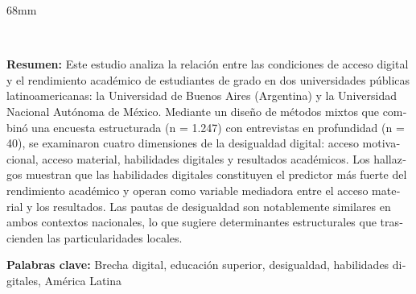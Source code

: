 \begin{textblock*}{68mm}
{\begin{minipage}[t]{68mm}
{\href{https://wa.me/?text=https%3A%2F%2Fwww.redalyc.org%2Fjournal%2F4136%2F413677448001%2Fhtml%2F}{}~
\href{https://twitter.com/intent/tweet?url=https%3A%2F%2Fwww.redalyc.org%2Fjournal%2F4136%2F413677448001%2Fhtml%2F&text=Desigualdad%20digital%20y%20rendimiento%20acad%C3%A9mico%20en%20la%20educaci%C3%B3n%20superior%3A%20un%20estudio%20comparativo%20en%20universidades%20p%C3%BAblicas%20de%20Argentina%20y%20M%C3%A9xico}{}
}\par
\end{minipage}%
}%
\end{textblock*}


\begin{tcolorbox}[colback=brown!8!white,colframe=brown!8!white,boxrule=0pt,arc=2pt,left=4pt,right=4pt,top=3pt,bottom=3pt,before skip=4pt,after skip=4pt]
\begin{otherlanguage}{spanish}
\sffamily\small \textbf{Resumen:} Este estudio analiza la relación entre las condiciones de acceso digital y el rendimiento académico de estudiantes de grado en dos universidades públicas latinoamericanas: la Universidad de Buenos Aires (Argentina) y la Universidad Nacional Autónoma de México. Mediante un diseño de métodos mixtos que combinó una encuesta estructurada (n = 1.247) con entrevistas en profundidad (n = 40), se examinaron cuatro dimensiones de la desigualdad digital: acceso motivacional, acceso material, habilidades digitales y resultados académicos. Los hallazgos muestran que las habilidades digitales constituyen el predictor más fuerte del rendimiento académico y operan como variable mediadora entre el acceso material y los resultados. Las pautas de desigualdad son notablemente similares en ambos contextos nacionales, lo que sugiere determinantes estructurales que trascienden las particularidades locales.
\par\smallskip\noindent\textbf{Palabras clave:} Brecha digital, educación superior, desigualdad, habilidades digitales, América Latina
\end{otherlanguage}
\end{tcolorbox}

